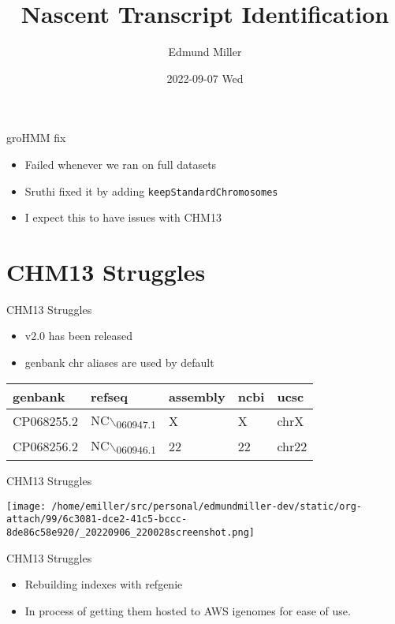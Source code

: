 \documentclass[bigger]{beamer}
\author{Edmund Miller}
\date{2022-09-07 Wed}
\title{Nascent Transcript Identification}
\begin{document}
\maketitle


\begin{frame}[label={sec:orgba95986},fragile]{groHMM fix}
 \begin{itemize}
\item Failed whenever we ran on full datasets
\item Sruthi fixed it by adding \texttt{keepStandardChromosomes}
\item I expect this to have issues with CHM13
\end{itemize}
\end{frame}
\section*{CHM13 Struggles}
\label{sec:org3b7bc68}
\begin{frame}[label={sec:org37eea3a}]{CHM13 Struggles}
\begin{itemize}
\item v2.0 has been released
\item genbank chr aliases are used by default
\end{itemize}
\begin{center}
\begin{tabular}{lllll}
genbank & refseq & assembly & ncbi & ucsc\\
\hline
CP068255.2 & NC$\backslash$\textsubscript{060947.1} & X & X & chrX\\
CP068256.2 & NC$\backslash$\textsubscript{060946.1} & 22 & 22 & chr22\\
\end{tabular}
\end{center}
\end{frame}

\begin{frame}[label={sec:orgf3b4e66}]{CHM13 Struggles}
\begin{center}
\texttt{[image: /home/emiller/src/personal/edmundmiller-dev/static/org-attach/99/6c3081-dce2-41c5-bccc-8de86c58e920/\_20220906\_220028screenshot.png]}
\end{center}
\end{frame}
\begin{frame}[label={sec:org90feffd}]{CHM13 Struggles}
\begin{itemize}
\item Rebuilding indexes with refgenie
\item In process of getting them hosted to AWS igenomes for ease of use.
\end{itemize}
\end{frame}
\end{document}
